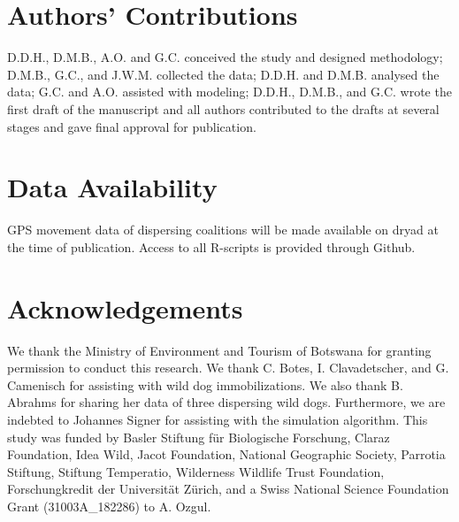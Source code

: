 \documentclass[abstract=on,10pt,a4paper,bibliography=totocnumbered]{article}
\begin{document}

\section{Authors' Contributions}
D.D.H., D.M.B., A.O. and G.C. conceived the study and designed methodology;
D.M.B., G.C., and J.W.M. collected the data; D.D.H. and D.M.B. analysed the
data; G.C. and A.O. assisted with modeling; D.D.H., D.M.B., and G.C. wrote the
first draft of the manuscript and all authors contributed to the drafts at
several stages and gave final approval for publication.

\section{Data Availability}
GPS movement data of dispersing coalitions will be made available on dryad at
the time of publication. Access to all R-scripts is provided through Github.

\section{Acknowledgements}
We thank the Ministry of Environment and Tourism of Botswana for granting
permission to conduct this research. We thank C. Botes, I. Clavadetscher, and G.
Camenisch for assisting with wild dog immobilizations. We also thank B. Abrahms
for sharing her data of three dispersing wild dogs. Furthermore, we are indebted
to Johannes Signer for assisting with the simulation algorithm. This study was
funded by Basler Stiftung für Biologische Forschung, Claraz Foundation, Idea
Wild, Jacot Foundation, National Geographic Society, Parrotia Stiftung, Stiftung
Temperatio, Wilderness Wildlife Trust Foundation, Forschungkredit der
Universität Zürich, and a Swiss National Science Foundation Grant
(31003A\_182286) to A. Ozgul.

\newpage
\begingroup
\singlespacing

\endgroup
\end{document}
